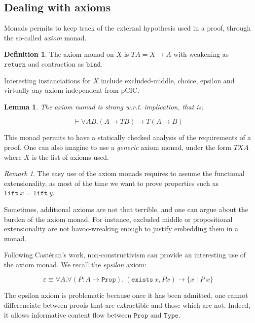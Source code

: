 \documentclass{article}
\newtheorem{lemma}{Lemma}
\theoremstyle{definition}
\newtheorem{definition}{Definition}
\theoremstyle{remark}
\newtheorem{remark}{Remark}
\begin{document}
\subsection{Dealing with axioms}

Monads permits to keep track of the external hypothesis used in a proof, through the so-called \emph{axiom} monad.

\begin{definition}
  The axiom monad on $X$ is $T A = X \rightarrow A$ with weakening as $\mathtt{return}$ and contraction as $\mathtt{bind}$.
\end{definition}

Interesting instanciations for $X$ include excluded-middle, choice, epsilon and virtually any axiom independent from pCIC.

\begin{lemma}
  The axiom monad is strong w.r.t. implication, that is:

$$\vdash \forall A B. (A \rightarrow T B) \rightarrow T (A \rightarrow B)$$
\end{lemma}

This monad permits to have a statically checked analysis of the requirements of a proof. One can also imagine to use a \emph{generic} axiom monad, under the form $T X A$ where $X$ is the list of axioms used.

\begin{remark}
  The easy use of the axiom monads requires to assume the functional extensionality, as most of the time we want to prove properties such as $\mathtt{lift}\ x = \mathtt{lift}\ y$.
\end{remark}

Sometimes, additional axioms are not that terrible, and one can argue about the burden of the axiom monad. For instance, excluded middle or propositional extensionality are not havoc-wreaking enough to justify embedding them in a monad.

Following Castéran's work, non-constructivism can provide an interesting use of the axiom monad. We recall the \emph{epsilon} axiom:

$$\varepsilon \equiv \forall A.\forall (P : A\rightarrow  \mathtt{Prop}).\ (\mathtt{exists}\ x, P x) \rightarrow \{x\mid P\  x\}$$

The epsilon axiom is problematic because once it has been admitted, one cannot differenciate between proofs that are extractible and those which are not. Indeed, it allows informative content flow between $\mathtt{Prop}$ and $\mathtt{Type}$.
\end{document}

